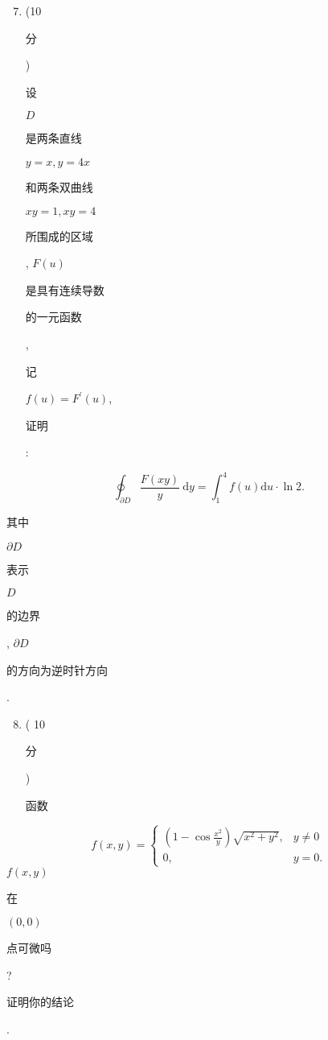\documentclass[10pt]{article}
\begin{document}
\begin{enumerate}
  \setcounter{enumi}{6}
  \item (10 \begin{CJK}{UTF8}{mj}分\end{CJK}) \begin{CJK}{UTF8}{mj}设\end{CJK} $D$ \begin{CJK}{UTF8}{mj}是两条直线\end{CJK} $y=x, y=4 x$ \begin{CJK}{UTF8}{mj}和两条双曲线\end{CJK} $x y=1, x y=4$ \begin{CJK}{UTF8}{mj}所围成的区域\end{CJK}, $F(u)$ \begin{CJK}{UTF8}{mj}是具有连续导数\end{CJK} \begin{CJK}{UTF8}{mj}的一元函数\end{CJK}, \begin{CJK}{UTF8}{mj}记\end{CJK} $f(u)=F^{\prime}(u)$, \begin{CJK}{UTF8}{mj}证明\end{CJK}:
\end{enumerate}
$$
\oint_{\partial D} \frac{F(x y)}{y} \mathrm{~d} y=\int_{1}^{4} f(u) \mathrm{d} u \cdot \ln 2 .
$$
\begin{CJK}{UTF8}{mj}其中\end{CJK} $\partial D$ \begin{CJK}{UTF8}{mj}表示\end{CJK} $D$ \begin{CJK}{UTF8}{mj}的边界\end{CJK}, $\partial D$ \begin{CJK}{UTF8}{mj}的方向为逆时针方向\end{CJK}.

\begin{enumerate}
  \setcounter{enumi}{7}
  \item ( 10 \begin{CJK}{UTF8}{mj}分\end{CJK}) \begin{CJK}{UTF8}{mj}函数\end{CJK}
\end{enumerate}
$$
f(x, y)= \begin{cases}\left(1-\cos \frac{x^{2}}{y}\right) \sqrt{x^{2}+y^{2}}, & y \neq 0 \\ 0, & y=0 .\end{cases}
$$
$f(x, y)$ \begin{CJK}{UTF8}{mj}在\end{CJK} $(0,0)$ \begin{CJK}{UTF8}{mj}点可微吗\end{CJK}? \begin{CJK}{UTF8}{mj}证明你的结论\end{CJK}.
\end{document}
